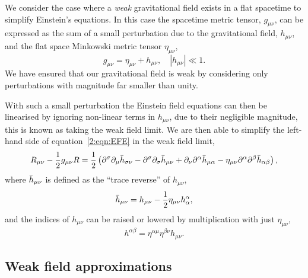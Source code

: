 We consider the case where a \textit{weak} gravitational field exists in a flat spacetime to simplify Einstein's equations. In this case the spacetime metric tensor, $g_{\mu\nu}$, can be expressed as the sum of a small perturbation due to the gravitational field, $h_{\mu\nu}$, and the flat space Minkowski metric tensor $\eta_{\mu\nu}$,
%
\begin{equation}
g_{\mu\nu} = \eta_{\mu\nu} + h_{\mu\nu}, \quad |h_{\mu\nu}| \ll 1.
\end{equation}
%
We have ensured that our gravitational field is weak by considering only perturbations with magnitude far smaller than unity.

With such a small perturbation the Einstein field equations can then be linearised by ignoring non-linear terms in $h_{\mu\nu}$, due to their negligible magnitude, this is known as taking the weak field limit. We are then able to simplify the left-hand side of equation~\ref{2:eqn:EFE} in the weak field limit,
%
\begin{equation}
    R_{\mu\nu} - \frac{1}{2}g_{\mu\nu}R = \frac{1}{2}\left(\partial^{\sigma}\partial_{\mu}\Bar{h}_{\sigma\nu} - \partial^{\sigma}\partial_{\sigma}\Bar{h}_{\mu\nu} + \partial_{\nu}\partial^{\alpha}\Bar{h}_{\mu\alpha} - \eta_{\mu\nu}\partial^{\alpha}\partial^{\beta}\Bar{h}_{\alpha\beta}\right) ,
\end{equation}
%
where $\Bar{h}_{\mu\nu}$ is defined as the ``trace reverse'' of $h_{\mu\nu}$,
%
\begin{equation}
    \Bar{h}_{\mu\nu} = h_{\mu\nu} - \frac{1}{2}\eta_{\mu\nu}h_{\alpha}^{\alpha} ,
    \label{2:eq:trace-reverse-h}
\end{equation}
%
and the indices of $h_{\mu\nu}$ can be raised or lowered by multiplication with just $\eta_{\mu\nu}$,
%
\begin{equation}
    h^{\alpha\beta} = \eta^{\alpha\mu}\eta^{\beta\nu}h_{\mu\nu} .
\end{equation}
%

\subsection{\label{1:sec:weak-field}Weak field approximations}

